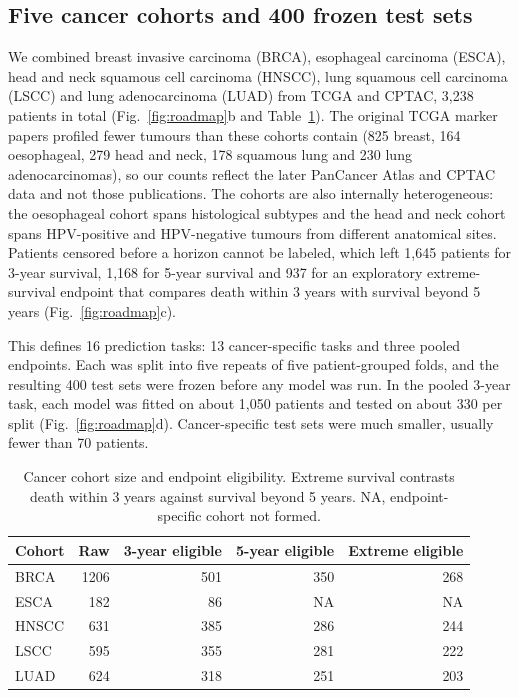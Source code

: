 \documentclass[pdflatex,sn-nature]{sn-jnl}
\begin{document}
\subsection*{Five cancer cohorts and 400 frozen test sets}

We combined breast invasive carcinoma (BRCA), esophageal carcinoma (ESCA), head and neck squamous cell carcinoma (HNSCC), lung squamous cell carcinoma (LSCC) and lung adenocarcinoma (LUAD) from TCGA and CPTAC, 3,238 patients in total (Fig.~\ref{fig:roadmap}b and Table~\ref{tab:cohorts}).\citep{tcga2012brca,tcga2017esca,tcga2015hnsc,tcga2012lusc,tcga2014luad,liu2018clinical,li2023pancancer} The original TCGA marker papers profiled fewer tumours than these cohorts contain (825 breast, 164 oesophageal, 279 head and neck, 178 squamous lung and 230 lung adenocarcinomas),\citep{tcga2012brca,tcga2017esca,tcga2015hnsc,tcga2012lusc,tcga2014luad} so our counts reflect the later PanCancer Atlas and CPTAC data and not those publications. The cohorts are also internally heterogeneous: the oesophageal cohort spans histological subtypes and the head and neck cohort spans HPV-positive and HPV-negative tumours from different anatomical sites.\citep{tcga2017esca,tcga2015hnsc} Patients censored before a horizon cannot be labeled, which left 1,645 patients for 3-year survival, 1,168 for 5-year survival and 937 for an exploratory extreme-survival endpoint that compares death within 3 years with survival beyond 5 years (Fig.~\ref{fig:roadmap}c).

This defines 16 prediction tasks: 13 cancer-specific tasks and three pooled endpoints. Each was split into five repeats of five patient-grouped folds, and the resulting 400 test sets were frozen before any model was run. In the pooled 3-year task, each model was fitted on about 1,050 patients and tested on about 330 per split (Fig.~\ref{fig:roadmap}d). Cancer-specific test sets were much smaller, usually fewer than 70 patients.

\begin{table}[ht]
\centering
\caption{Cancer cohort size and endpoint eligibility. Extreme survival contrasts death within 3 years against survival beyond 5 years. NA, endpoint-specific cohort not formed.}
\label{tab:cohorts}
\begin{tabular}{lrrrr}
\toprule
Cohort & Raw & 3-year eligible & 5-year eligible & Extreme eligible \\
\midrule
BRCA & 1206 & 501 & 350 & 268 \\
ESCA & 182 & 86 & NA & NA \\
HNSCC & 631 & 385 & 286 & 244 \\
LSCC & 595 & 355 & 281 & 222 \\
LUAD & 624 & 318 & 251 & 203 \\
\bottomrule
\end{tabular}

\end{table}
\end{document}
